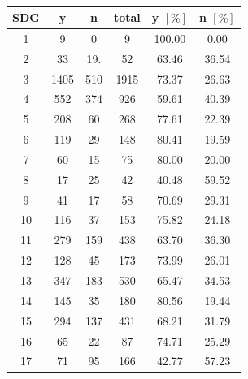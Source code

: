 \documentclass{article}
\begin{document}
\begin{minipage}[H]{0.45\textwidth}
\begin{table}[H]
\centering 
 \begin{tabular}{cccccc}
 \toprule
 SDG & y & n & total & y $[\%]$ & n $[\%]$ \\
 \hline
  1 & 9 & 0 & 9 & 100.00 & 0.00 \\
 2 & 33 & 19. & 52 & 63.46 & 36.54 \\
 3 & 1405 & 510 & 1915 & 73.37 & 26.63 \\
 4 & 552 & 374 & 926 & 59.61 & 40.39 \\
 5 & 208 & 60 & 268 & 77.61 & 22.39 \\
 6 & 119 & 29 & 148 & 80.41 & 19.59 \\
 7 & 60 & 15 & 75 & 80.00 & 20.00 \\
 8 & 17 & 25 & 42 & 40.48 & 59.52 \\
 9 & 41 & 17 & 58 & 70.69 & 29.31 \\
 10 & 116 & 37 & 153 & 75.82 & 24.18 \\
 11 & 279 & 159 & 438 & 63.70 & 36.30 \\
 12 & 128 & 45 & 173 & 73.99 & 26.01 \\
 13 & 347 & 183 & 530 & 65.47 & 34.53 \\
 14 & 145 & 35 & 180 & 80.56 & 19.44 \\
 15 & 294 & 137 & 431 & 68.21 & 31.79 \\
 16 & 65 & 22 & 87 & 74.71 & 25.29 \\
 17 & 71 & 95 & 166 & 42.77 & 57.23 \\
 \bottomrule
\end{tabular}
\caption{}
\label{precisionv5survold}
\end{table}
\end{minipage}
\end{document}
